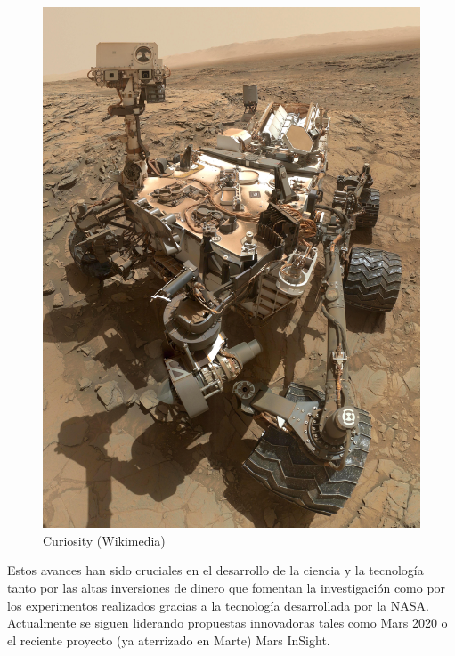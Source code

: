 \begin{figure}[!h]
	\centering
	\includegraphics[scale=0.035]{./EtapaModerna/Imagenes/curiosity.jpg}
	\caption{Curiosity (\href{https://en.wikipedia.org/wiki/File:Curiosity_Self-Portrait_at_\%27Big_Sky\%27_Drilling_Site.jpg}{Wikimedia})}
	\label{fig:curiosity}
\end{figure}

Estos avances han sido cruciales en el desarrollo de la ciencia y la tecnología tanto por las altas inversiones de dinero que fomentan la investigación como por los experimentos realizados gracias a la tecnología desarrollada por la NASA. Actualmente se siguen liderando propuestas innovadoras tales como Mars 2020 o el reciente proyecto (ya aterrizado en Marte) Mars InSight.

